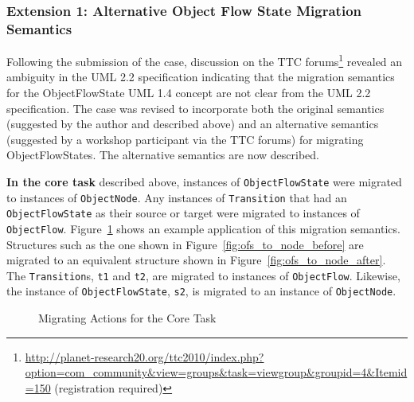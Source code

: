 \subsubsection{Extension 1: Alternative Object Flow State Migration Semantics}
\label{sub:object_flow_states}
Following the submission of the case, discussion on the TTC forums\footnote{\url{http://planet-research20.org/ttc2010/index.php?option=com_community&view=groups&task=viewgroup&groupid=4&Itemid=150} (registration required)} revealed an ambiguity in the UML 2.2 specification indicating that the migration semantics for the ObjectFlowState UML 1.4 concept are not clear from the UML 2.2 specification. The case was revised to incorporate both the original semantics (suggested by the author and described above) and an alternative semantics (suggested by a workshop participant via the TTC forums) for migrating ObjectFlowStates. The alternative semantics are now described.

\textbf{In the core task} described above, instances of \texttt{Ob\-je\-ctFl\-owSt\-a\-te} were migrated to instances of \texttt{Ob\-je\-ctNo\-de}. Any instances of \texttt{Tr\-an\-si\-ti\-on} that had an \texttt{Ob\-je\-ctFl\-owSt\-a\-te} as their source or target were migrated to instances of \texttt{Ob\-je\-ctFl\-ow}. Figure~\ref{fig:ofs_to_node} shows an example application of this migration semantics. Structures such as the one shown in Figure~\ref{fig:ofs_to_node_before} are migrated to an equivalent structure shown in Figure~\ref{fig:ofs_to_node_after}. The \texttt{Tr\-an\-si\-ti\-on}s, \texttt{t1} and \texttt{t2}, are migrated to instances of \texttt{Ob\-je\-ctFl\-ow}. Likewise, the instance of \texttt{Ob\-je\-ctFl\-owSt\-a\-te}, \texttt{s2}, is migrated to an instance of \texttt{Ob\-je\-ctNo\-de}.

\begin{figure}[htbp]
	\centering
	\caption{Migrating Actions for the Core Task}
\label{fig:ofs_to_node}
\end{figure}


